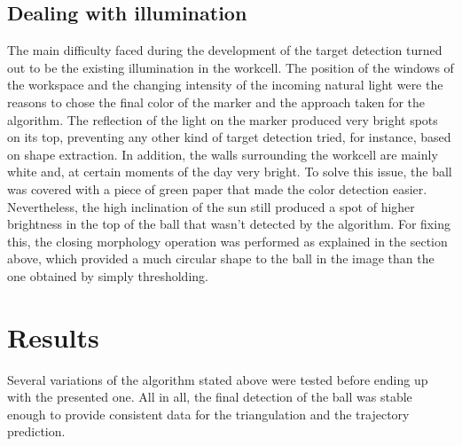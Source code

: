 \subsection{Dealing with illumination}
The main difficulty faced during the development of the target detection turned out to be the existing illumination in the workcell.
The position of the windows of the workspace and the changing intensity of the incoming natural light were the reasons to chose the final color of the marker and the approach taken for the algorithm.
The reflection of the light on the marker produced very bright spots on its top, preventing any other kind of target detection tried, for instance, based on shape extraction.
In addition, the walls surrounding the workcell are mainly white and, at certain moments of the day very bright.
To solve this issue, the ball was covered with a piece of green paper that made the color detection easier. Nevertheless, the high inclination of the sun still produced a spot of higher brightness in the top of the ball that wasn't detected by the algorithm. For fixing this, the closing morphology operation was performed as explained in the section above, which provided a much circular shape to the ball in the image than the one obtained by simply thresholding.

\section{Results}
Several variations of the algorithm stated above were tested before ending up with the presented one.
All in all, the final detection of the ball was stable enough to provide consistent data for the triangulation and the trajectory prediction.

